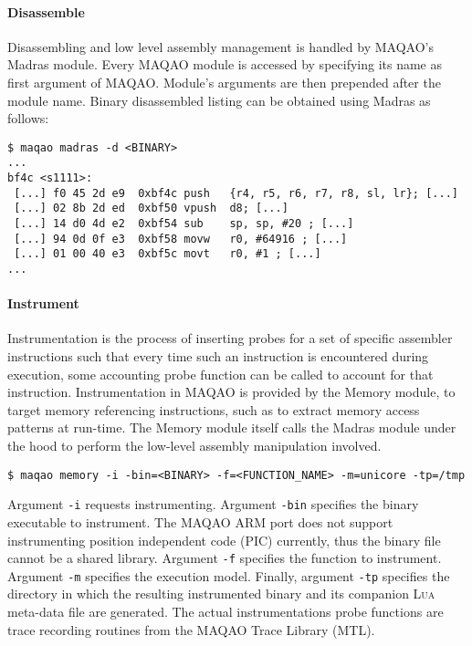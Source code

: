 \documentclass[11pt, a4paper, twoside]{montblanc2}
\def\lua{\textsc{Lua}\xspace}
\begin{document}
\paragraph{Disassemble}

Disassembling and low level assembly management is handled by MAQAO's Madras module. Every MAQAO 
module is accessed by specifying its name as first argument of MAQAO. Module's arguments are then 
prepended after the module name. Binary disassembled listing can be obtained using Madras as 
follows:

\begin{verbatim}
$ maqao madras -d <BINARY>
...
bf4c <s1111>:
 [...] f0 45 2d e9  0xbf4c push   {r4, r5, r6, r7, r8, sl, lr}; [...]
 [...] 02 8b 2d ed  0xbf50 vpush  d8; [...]
 [...] 14 d0 4d e2  0xbf54 sub    sp, sp, #20 ; [...]
 [...] 94 0d 0f e3  0xbf58 movw   r0, #64916 ; [...]
 [...] 01 00 40 e3  0xbf5c movt   r0, #1 ; [...]
...
\end{verbatim}

\paragraph{Instrument}

Instrumentation is the process of inserting probes for a set of specific
assembler instructions such that every time such an instruction is encountered
during execution, some accounting probe function can be called to account for
that instruction. Instrumentation in MAQAO is provided by the Memory module,
to target memory referencing instructions, such as to extract memory access
patterns at run-time. The Memory module itself calls the Madras module under the
hood to perform the low-level assembly manipulation involved.

\begin{verbatim}
$ maqao memory -i -bin=<BINARY> -f=<FUNCTION_NAME> -m=unicore -tp=/tmp
\end{verbatim}

Argument \verb|-i| requests instrumenting. Argument \verb|-bin| specifies the
binary executable to instrument. The MAQAO ARM port does not support
instrumenting position independent code (PIC) currently, thus the binary file
cannot be a shared library. Argument \verb|-f| specifies the function to
instrument. Argument \verb|-m| specifies the execution model. Finally, argument
\verb|-tp| specifies the directory in which the resulting instrumented binary
and its companion \lua meta-data file are generated. The actual instrumentations 
probe functions are trace recording routines from the MAQAO Trace Library (MTL).
\end{document}
